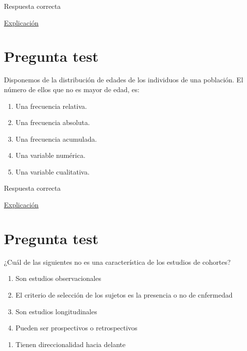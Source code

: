 \documentclass[
]{book}
\providecommand{\tightlist}{%
  \setlength{\itemsep}{0pt}\setlength{\parskip}{0pt}}
\begin{document}
Respuesta correcta

\href{https://1fjmanzano.github.io/bioestadistica/conceptos-previos.html}{Explicación}

\hypertarget{pregunta-test-18}{%
\section{Pregunta test}\label{pregunta-test-18}}

Disponemos de la distribución de edades de los individuos de una población. El número de ellos que no es mayor de edad, es:

\begin{enumerate}
\def\labelenumi{\alph{enumi})}
\tightlist
\item
  Una frecuencia relativa.
\item
  Una frecuencia absoluta.
\item
  Una frecuencia acumulada.
\item
  Una variable numérica.
\item
  Una variable cualitativa.
\end{enumerate}

Respuesta correcta

\href{https://1fjmanzano.github.io/bioestadistica/tablas-de-frecuencias.html}{Explicación}

\hypertarget{pregunta-test-19}{%
\section{Pregunta test}\label{pregunta-test-19}}

¿Cuál de las siguientes no es una característica de los estudios de cohortes?

\begin{enumerate}
\def\labelenumi{\alph{enumi})}
\tightlist
\item
  Son estudios observacionales
\item
  El criterio de selección de los sujetos es la presencia o no de cnfermedad
\item
  Son estudios longitudinales
\item
  Pueden ser prospectivos o retrospectivos
\end{enumerate}

\begin{enumerate}
\def\labelenumi{\arabic{enumi})}
\setcounter{enumi}{4}
\tightlist
\item
  Tienen direccionalidad hacia delante
\end{enumerate}
\end{document}
